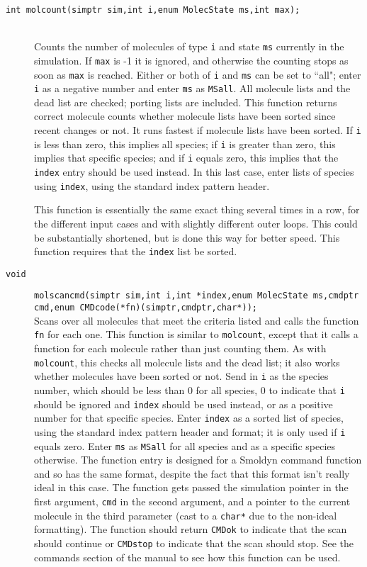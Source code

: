 \documentclass {book}
\newcommand {\ttt} {\texttt}
\begin{document}
\begin{description}
\item[\ttt{int molcount(simptr sim,int i,enum MolecState ms,int max);}]
\hfill \\
Counts the number of molecules of type \ttt{i} and state \ttt{ms} currently in the simulation. If \ttt{max} is -1 it is ignored, and otherwise the counting stops as soon as \ttt{max} is reached. Either or both of \ttt{i} and \ttt{ms} can be set to ``all"; enter \ttt{i} as a negative number and enter \ttt{ms} as \ttt{MSall}. All molecule lists and the dead list are checked; porting lists are included. This function returns correct molecule counts whether molecule lists have been sorted since recent changes or not. It runs fastest if molecule lists have been sorted. If \ttt{i} is less than zero, this implies all species; if \ttt{i} is greater than zero, this implies that specific species; and if \ttt{i} equals zero, this implies that the \ttt{index} entry should be used instead. In this last case, enter lists of species using \ttt{index}, using the standard index pattern header.

This function is essentially the same exact thing several times in a row, for the different input cases and with slightly different outer loops. This could be substantially shortened, but is done this way for better speed. This function requires that the \ttt{index} list be sorted.

\item[\ttt{void}]
\ttt{molscancmd(simptr sim,int i,int *index,enum MolecState ms,cmdptr cmd,enum CMDcode(*fn)(simptr,cmdptr,char*));}
\hfill \\
Scans over all molecules that meet the criteria listed and calls the function \ttt{fn} for each one. This function is similar to \ttt{molcount}, except that it calls a function for each molecule rather than just counting them. As with \ttt{molcount}, this checks all molecule lists and the dead list; it also works whether molecules have been sorted or not. Send in \ttt{i} as the species number, which should be less than 0 for all species, 0 to indicate that \ttt{i} should be ignored and \ttt{index} should be used instead, or as a positive number for that specific species. Enter \ttt{index} as a sorted list of species, using the standard index pattern header and format; it is only used if \ttt{i} equals zero. Enter \ttt{ms} as \ttt{MSall} for all species and as a specific species otherwise. The function entry is designed for a Smoldyn command function and so has the same format, despite the fact that this format isn't really ideal in this case. The function gets passed the simulation pointer in the first argument, \ttt{cmd} in the second argument, and a pointer to the current molecule in the third parameter (cast to a \ttt{char*} due to the non-ideal formatting). The function should return \ttt{CMDok} to indicate that the scan should continue or \ttt{CMDstop} to indicate that the scan should stop. See the commands section of the manual to see how this function can be used.


\end{description}
\end{document}
